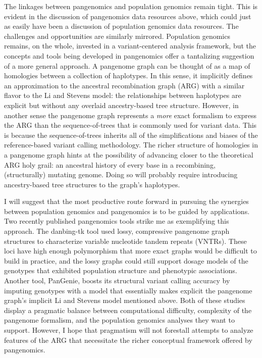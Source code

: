 \documentclass[11pt]{ucthesis}
\begin{document}
The linkages between pangenomics and population genomics remain tight. This is evident in the discussion of pangenomics data resources above, which could just as easily have been a discussion of population genomics data resources. The challenges and opportunities are similarly mirrored. Population genomics remains, on the whole, invested in a variant-centered analysis framework, but the concepts and tools being developed in pangenomics offer a tantalizing suggestion of a more general approach. A pangenome graph can be thought of as a map of homologies between a collection of haplotypes. In this sense, it implicitly defines an approximation to the ancestral recombination graph (ARG) with a similar flavor to the Li and Stevens model\cite{li2003modeling}: the relationships between haplotypes are explicit but without any overlaid ancestry-based tree structure. However, in another sense the pangenome graph represents a \emph{more} exact formalism to express the ARG than the sequence-of-trees that is commonly used for variant data\cite{rasmussen2014genome,kelleher2019inferring}. This is because the sequence-of-trees inherits all of the simplifications and biases of the reference-based variant calling methodology. The richer structure of homologies in a pangenome graph hints at the possibility of advancing closer to the theoretical ARG holy grail: an ancestral history of every base in a recombining, (structurally) mutating genome. Doing so will probably require introducing ancestry-based tree structures to the graph's haplotypes.

I will suggest that the most productive route forward in pursuing the synergies between population genomics and pangenomics is to be guided by applications. Two recently published pangenomics tools strike me as exemplifying this approach. The danbing-tk tool used lossy, compressive pangenome graph structures to characterize variable nucleotide tandem repeats (VNTRs)\cite{lu2021profiling}. These loci have high enough polymorphism that more exact graphs would be difficult to build in practice, and the lossy graphs could still support dosage models of the genotypes that exhibited population structure and phenotypic associations. Another tool, PanGenie, boosts its structural variant calling accuracy by imputing genotypes with a model that essentially makes explicit the pangenome graph's implicit Li and Stevens model mentioned above\cite{ebler2020pangenome}. Both of these studies display a pragmatic balance between computational difficulty, complexity of the pangenome formalism, and the population genomics analyses they want to support. However, I hope that pragmatism will not forestall attempts to analyze features of the ARG that necessitate the richer conceptual framework offered by pangenomics.
\end{document}
